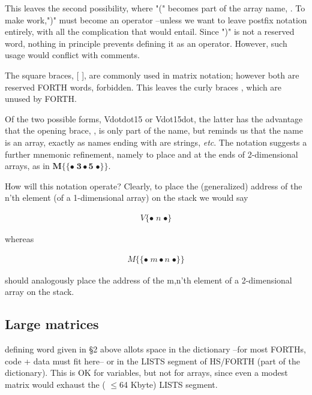 This leaves the second possibility, where "(" becomes part of the array name, . To make  work,")" must become an operator --unless we want to leave postfix notation entirely, with all the complication that would entail. Since ")" is not a reserved word, nothing in principle prevents defining it as an operator. However, such usage would conflict with comments.

The square braces, [ ], are commonly used in matrix notation; however both are reserved FORTH words, \ie forbidden. This leaves the curly braces { }, which are unused by FORTH.

Of the two possible forms, Vdot{dot15} or V{dot15dot}, the latter has the
advantage that the opening brace, \regc{\{}, is only part of the name, but
reminds us that the name  is an array, exactly as names ending with
\bc{\$} are strings, \textit{etc}. The notation suggests a further mnemonic
refinement, namely to place \bc{\{\{} and \bc{\}\}} at the ends of
2-dimensional arrays, as in $\mathbf{M\{\{\bullet \;3 \bullet 5 \;\bullet \}\}}$.

How will this notation operate? Clearly, to place the (generalized) address of the n'th element (of a 1-dimensional array) on the stack we would say

\begin{align*}
    V\{\bullet \;n \;\bullet\}
\end{align*}

whereas

\begin{align*}
    M\{\{ \bullet \;m \bullet n \;\bullet\}\}
\end{align*}

should analogously place the address of the m,n'th element of a 2-dimensional array on the stack.

\subsection{Large matrices}
 defining word  given in \S2 above allots space in the dictionary --for most FORTHs, code + data must fit here-- or in the LISTS segment of HS/FORTH (part of the dictionary). This is OK for variables, but not for arrays, since even a modest matrix would exhaust the ( $\leq$64 Kbyte) LISTS segment.

